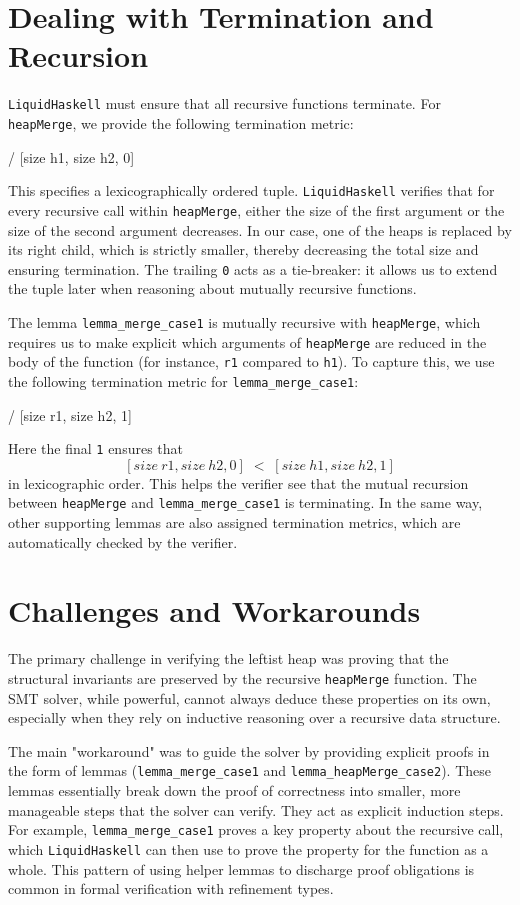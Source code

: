 \section{Dealing with Termination and Recursion}

\texttt{LiquidHaskell} must ensure that all recursive functions terminate. 
For \texttt{heapMerge}, we provide the following termination metric:

\begin{code}
/ [size h1, size h2, 0]
\end{code}

This specifies a lexicographically ordered tuple. 
\texttt{LiquidHaskell} verifies that for every recursive call within \texttt{heapMerge}, either the size of the first argument or the size of the second argument decreases. 
In our case, one of the heaps is replaced by its right child, which is strictly smaller, thereby decreasing the total size and ensuring termination. 
The trailing \texttt{0} acts as a tie-breaker: it allows us to extend the tuple later when reasoning about mutually recursive functions.

The lemma \texttt{lemma\_merge\_case1} is mutually recursive with \texttt{heapMerge}, which requires us to make explicit which arguments of \texttt{heapMerge} are reduced in the body of the function (for instance, \texttt{r1} compared to \texttt{h1}). 
To capture this, we use the following termination metric for \texttt{lemma\_merge\_case1}:

\begin{code}
/ [size r1, size h2, 1]
\end{code}

Here the final \texttt{1} ensures that 
\[
[size\ r1, size\ h2, 0] \;<\; [size\ h1, size\ h2, 1]
\]
in lexicographic order. 
This helps the verifier see that the mutual recursion between \texttt{heapMerge} and \texttt{lemma\_merge\_case1} is terminating.
In the same way, other supporting lemmas are also assigned termination metrics, which are automatically checked by the verifier.
\section{Challenges and Workarounds}
The primary challenge in verifying the leftist heap was proving that the structural invariants are preserved by the recursive \texttt{heapMerge} function. The SMT solver, while powerful, cannot always deduce these properties on its own, especially when they rely on inductive reasoning over a recursive data structure.

The main "workaround" was to guide the solver by providing explicit proofs in the form of lemmas (\texttt{lemma\_merge\_case1} and \texttt{lemma\_heapMerge\_case2}). These lemmas essentially break down the proof of correctness into smaller, more manageable steps that the solver can verify. They act as explicit induction steps. For example, \texttt{lemma\_merge\_case1} proves a key property about the recursive call, which \texttt{LiquidHaskell} can then use to prove the property for the function as a whole. This pattern of using helper lemmas to discharge proof obligations is common in formal verification with refinement types.


